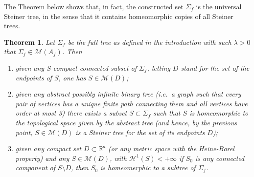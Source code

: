 \documentclass{amsart}
\newcommand{\RR}{\mathbb R}
\renewcommand{\H}{\mathcal H}
\newcommand{\M}{\mathcal{M}}
\renewcommand{\H}{\mathcal{H}}
\newtheorem{theorem}{Theorem}[section]
\theoremstyle{definition}
\theoremstyle{remark}
\begin{document}
The Theorem below shows that, in fact, the constructed set 
$\Sigma_f$ is the universal Steiner tree, 
in the sense that it contains homeomorphic copies of all 
Steiner trees.

\begin{theorem}
Let $\Sigma_f$ be the full tree as defined in the introduction
with such $\lambda>0$ that $\Sigma_f\in \M(A_f)$.
Then
\begin{enumerate}
  \item[(i)]
given any $S$ compact connected subset of $\Sigma_f$, 
letting $D$ stand for the set of the endpoints of $S$,
one has $S\in \M(D)$;
  \item[(ii)]
given any abstract possibly infinite binary tree (i.e.\ a graph 
such that every pair of vertices has a unique finite path connecting them and all vertices 
have order at most 3) 
there exists a subset $S\subset \Sigma_f$
such that $S$ is homeomorphic to the topological space given by the abstract tree 
(and hence, by the previous point, $S\in \M(D)$ is a Steiner tree for 
the set of its endpoints $D$);
  \item[(iii)] given any compact set $D\subset \RR^d$ 
  (or any metric space with the Heine-Borel property) 
  and any $S\in \M(D)$, with $\H^1(S)<+\infty$ if $S_0$ 
  is any connected component of $S\setminus D$, 
  then $S_0$ is homeomerphic to a subtree of $\Sigma_f$.
\end{enumerate}
\end{theorem}
%
\end{document}
